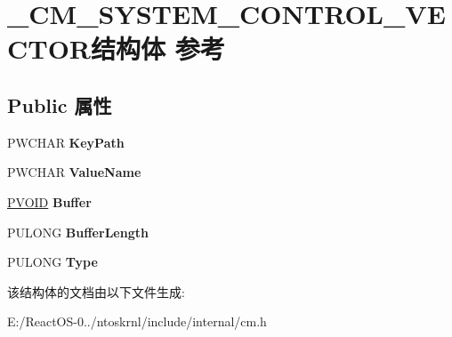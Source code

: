 \hypertarget{struct___c_m___s_y_s_t_e_m___c_o_n_t_r_o_l___v_e_c_t_o_r}{}\section{\+\_\+\+C\+M\+\_\+\+S\+Y\+S\+T\+E\+M\+\_\+\+C\+O\+N\+T\+R\+O\+L\+\_\+\+V\+E\+C\+T\+O\+R结构体 参考}
\label{struct___c_m___s_y_s_t_e_m___c_o_n_t_r_o_l___v_e_c_t_o_r}
\subsection*{Public 属性}
\begin{DoxyCompactItemize}
\item 
\mbox{\label{struct___c_m___s_y_s_t_e_m___c_o_n_t_r_o_l___v_e_c_t_o_r_aa55843bca3b20cab459c3ce4310b137b}} 
P\+W\+C\+H\+AR {\bfseries Key\+Path}
\item 
\mbox{\label{struct___c_m___s_y_s_t_e_m___c_o_n_t_r_o_l___v_e_c_t_o_r_a2ef0ae4c0ae9216eee38887b48232d17}} 
P\+W\+C\+H\+AR {\bfseries Value\+Name}
\item 
\mbox{\label{struct___c_m___s_y_s_t_e_m___c_o_n_t_r_o_l___v_e_c_t_o_r_a6f7ec29b288b7c2d59d647ee322362ba}} 
\hyperlink{interfacevoid}{P\+V\+O\+ID} {\bfseries Buffer}
\item 
\mbox{\label{struct___c_m___s_y_s_t_e_m___c_o_n_t_r_o_l___v_e_c_t_o_r_a446d9dd463e38aeec2122f6f33549f63}} 
P\+U\+L\+O\+NG {\bfseries Buffer\+Length}
\item 
\mbox{\label{struct___c_m___s_y_s_t_e_m___c_o_n_t_r_o_l___v_e_c_t_o_r_aec9c35bae28435cadb4d3da904a8d2f9}} 
P\+U\+L\+O\+NG {\bfseries Type}
\end{DoxyCompactItemize}


该结构体的文档由以下文件生成\+:\begin{DoxyCompactItemize}
\item 
E\+:/\+React\+O\+S-\/0../ntoskrnl/include/internal/cm.\+h\end{DoxyCompactItemize}

